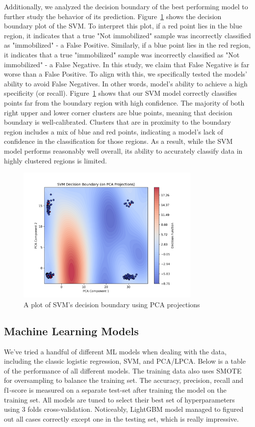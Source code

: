 \documentclass[10pt,letterpaper]{article}
\begin{document}
Additionally, we analyzed the decision boundary of the best performing model to further study the behavior of its prediction. Figure~\ref{fig:svm_decision} shows the decision boundary plot of the SVM. To interpret this plot, if a red point lies in the blue region, it indicates that a true "Not immobilized" sample was incorrectly classified as "immobilized" - a False Positive. Similarly, if a blue point lies in the red region, it indicates that a true "immobilized" sample was incorrectly classified as "Not immobilized" - a False Negative. In this study, we claim that False Negative is far worse than a False Positive. To align with this, we specifically tested the models' ability to avoid False Negatives. In other words, model's ability to achieve a high specificity (or recall). Figure~\ref{fig:svm_decision} shows that our SVM model correctly classifies points far from the boundary region with high confidence. The majority of both right upper and lower corner clusters are blue points, meaning that decision boundary is well-calibrated. Clusters that are in proximity to the boundary region includes a mix of blue and red points, indicating a model's lack of confidence in the classification for those regions. As a result, while the SVM model performs reasonably well overall, its ability to accurately classify data in highly clustered regions is limited.

\begin{figure}[tb!]
%
\centering
\includegraphics[width=9cm]{plots/svm_decision.png}
\caption{A plot of SVM's decision boundary using PCA projections}%
\label{fig:svm_decision}
\end{figure}


\subsection{Machine Learning Models}
We've tried a handful of different ML models when dealing with the data, including the classic logistic regression, 
SVM, and PCA/LPCA. Below is a table of the performance of all different models. 
The training data also uses SMOTE for oversampling to balance the training set. 
The accuracy, precision, recall and f1-score is measured on a separate test-set after training the model on the training set. 
All models are tuned to select their best set of hyperparameters using 3 folds cross-validation. 
Noticeably, LightGBM model managed to figured out all cases correctly except one in the testing set, which is really impressive.
\end{document}
